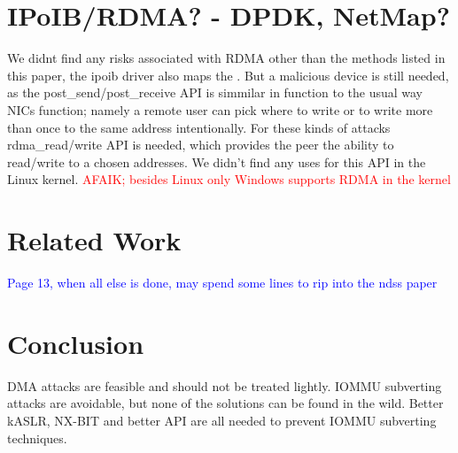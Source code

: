 \section{IPoIB/RDMA? - DPDK, NetMap?}
We didnt find any risks associated with RDMA other than the methods listed in this paper, the ipoib driver also maps the \shinfo. But a malicious device is still needed, as the post\_send/post\_receive API is simmilar in function to the usual way NICs function; namely a remote user can pick where to write or to write more than once to the same address intentionally. For these kinds of attacks rdma\_read/write API is needed, which provides the peer the ability to read/write to a chosen addresses. We didn't find any uses for this API in the Linux kernel. \textcolor{red}{AFAIK; besides Linux only Windows supports RDMA in the kernel}
\section{Related Work}
\textcolor{blue}{Page 13, when all else is done, may spend some lines to rip into the ndss paper}
\section{Conclusion}
DMA attacks are feasible and should not be treated lightly. IOMMU subverting attacks are avoidable, but none of the solutions can be found in the wild. Better kASLR, NX-BIT and better API are all needed to prevent IOMMU subverting techniques. 